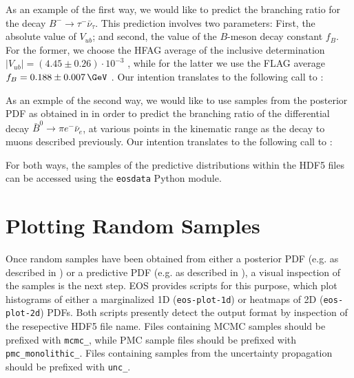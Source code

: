 As an example of the first way, we would like to predict the branching
ratio for the decay $B^- \to \tau^- \bar{\nu}_\tau$. This prediction involves
two parameters: First, the absolute value of $V_{ub}$; and second, the value
of the $B$-meson decay constant $f_{B}$. For the former, we choose the
HFAG average of the inclusive determination $|V_{ub}| = (4.45 \pm 0.26) \cdot 10^{-3}$
\cite{Amhis:2014hma}, while for the latter we use the FLAG average
$f_{B} = 0.188 \pm 0.007\,\GeV$ \cite{Aoki:2013ldr}.
Our intention translates to the following call to :

As an exmple of the second way, we would like to use samples from the posterior
PDF as obtained in  in order to predict the
branching ratio of the differential decay $\bar{B}^0\to \pi e^- \bar{\nu}_e$, at various
points in the kinematic range as the decay to muons described previously.
Our intention translates to the following call to :

For both ways, the samples of the predictive distributions within the HDF5 files
can be accessed using the \texttt{eosdata} Python module.

\section{Plotting Random Samples}
\label{sec:usage:eos-plot}

Once random samples have been obtained from either a posterior PDF (e.g. as
described in ) or a predictive PDF (e.g. as
described in ), a visual inspection of
the samples is the next step.  EOS provides scripts for this purpose, which
plot histograms of either a marginalized 1D (\texttt{eos-plot-1d}) or heatmaps
of 2D (\texttt{eos-plot-2d}) PDFs.  Both scripts presently detect the output
format by inspection of the resepective HDF5 file name. Files containing MCMC
samples should be prefixed with \texttt{mcmc\_}, while PMC sample files should
be prefixed with \texttt{pmc\_monolithic\_}. Files containing samples from the
uncertainty propagation should be prefixed with \texttt{unc\_}.

